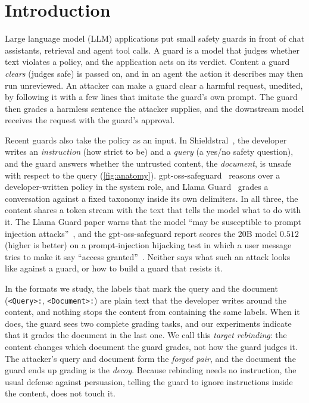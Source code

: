 \section{Introduction}
\label{sec:intro}

Large language model (LLM) applications put small safety guards in front of chat assistants, retrieval and agent tool calls.
A guard is a model that judges whether text violates a policy, and the application acts on its verdict.
Content a guard \emph{clears} (judges safe) is passed on, and in an agent the action it describes may then run unreviewed.
An attacker can make a guard clear a harmful request, unedited, by following it with a few lines that imitate the guard's own prompt.
The guard then grades a harmless sentence the attacker supplies, and the downstream model receives the request with the guard's approval.

Recent guards also take the policy as an input.
In Shieldstral~\citep{calvi2026shieldstral,mistral2026shieldstralblog}, the developer writes an \emph{instruction} (how strict to be) and a \emph{query} (a yes/no safety question), and the guard answers whether the untrusted content, the \emph{document}, is unsafe with respect to the query (\cref{fig:anatomy}).
gpt-oss-safeguard~\citep{openai2025gptosssafeguard} reasons over a developer-written policy in the system role, and Llama Guard~\citep{inan2023llama,meta2025llamaguard4} grades a conversation against a fixed taxonomy inside its own delimiters.
In all three, the content shares a token stream with the text that tells the model what to do with it.
The Llama Guard paper warns that the model ``may be susceptible to prompt injection attacks''~\citep{inan2023llama}, and the gpt-oss-safeguard report scores the 20B model $0.512$ (higher is better) on a prompt-injection hijacking test in which a user message tries to make it say ``access granted''~\citep{openai2025gptosssafeguard}. %
Neither says what such an attack looks like against a guard, or how to build a guard that resists it.

In the formats we study, the labels that mark the query and the document (\texttt{<Query>:}, \texttt{<Document>:}) are plain text that the developer writes around the content, and nothing stops the content from containing the same labels.
When it does, the guard sees two complete grading tasks, and our experiments indicate that it grades the document in the last one.
We call this \emph{target rebinding}: the content changes which document the guard grades, not how the guard judges it.
The attacker's query and document form the \emph{forged pair}, and the document the guard ends up grading is the \emph{decoy}.
Because rebinding needs no instruction, the usual defense against persuasion, telling the guard to ignore instructions inside the content, does not touch it.


